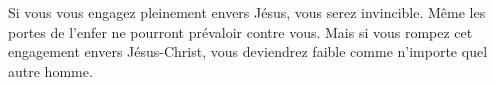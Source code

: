 
Si vous vous engagez pleinement envers Jésus, vous serez invincible.
 Même les portes de l'enfer ne pourront prévaloir contre vous.
 Mais si vous rompez cet engagement envers Jésus-Christ,
 vous deviendrez faible comme n'importe quel autre homme. 

\dvrule




